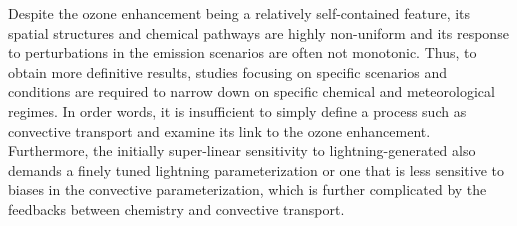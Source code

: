\vspace{1in}

\noindent Despite the ozone enhancement being a relatively self-contained feature, its spatial structures
and chemical pathways are highly non-uniform and its response to perturbations in the emission
scenarios are often not monotonic. Thus, to obtain more definitive results, studies
focusing on specific scenarios and conditions are required to narrow down on specific chemical
and meteorological regimes. In order words, it is insufficient to simply define a process such as
convective transport and examine its link to the ozone enhancement. Furthermore, the initially
super-linear sensitivity to lightning-generated  also demands a finely tuned lightning
parameterization or one that is less sensitive to biases in the convective parameterization, which
is further complicated by the feedbacks between chemistry and convective transport.
